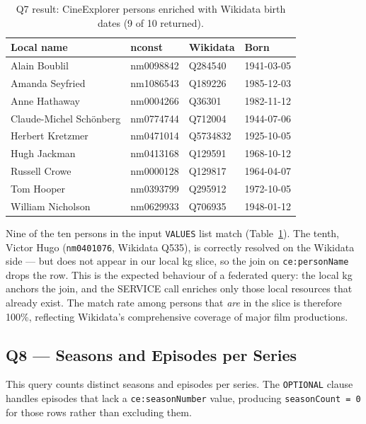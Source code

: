 \begin{table}[H]
\centering
\small
\begin{tabular}{llll}
\hline
\textbf{Local name} & \textbf{nconst} & \textbf{Wikidata} & \textbf{Born} \\
\hline
Alain Boublil           & nm0098842 & Q284540  & 1941-03-05 \\
Amanda Seyfried         & nm1086543 & Q189226  & 1985-12-03 \\
Anne Hathaway           & nm0004266 & Q36301   & 1982-11-12 \\
Claude-Michel Sch\"{o}nberg & nm0774744 & Q712004 & 1944-07-06 \\
Herbert Kretzmer        & nm0471014 & Q5734832 & 1925-10-05 \\
Hugh Jackman            & nm0413168 & Q129591  & 1968-10-12 \\
Russell Crowe           & nm0000128 & Q129817  & 1964-04-07 \\
Tom Hooper              & nm0393799 & Q295912  & 1972-10-05 \\
William Nicholson       & nm0629933 & Q706935  & 1948-01-12 \\
\hline
\end{tabular}
\caption{Q7 result: CineExplorer persons enriched with Wikidata birth dates (9 of 10 returned).}
\label{tab:q7-results}
\end{table}

Nine of the ten persons in the input \texttt{VALUES} list match (Table~\ref{tab:q7-results}). The tenth, Victor Hugo (\texttt{nm0401076}, Wikidata Q535), is correctly resolved on the Wikidata side --- but does not appear in our local \ac{kg} slice, so the join on \texttt{ce:personName} drops the row. This is the expected behaviour of a federated query: the local \ac{kg} anchors the join, and the SERVICE call enriches only those local resources that already exist. The match rate among persons that \emph{are} in the slice is therefore 100\%, reflecting Wikidata's comprehensive coverage of major film productions.

\subsection{Q8 — Seasons and Episodes per Series}

This query counts distinct seasons and episodes per series. The \texttt{OPTIONAL} clause handles episodes that lack a \texttt{ce:seasonNumber} value, producing \texttt{seasonCount~=~0} for those rows rather than excluding them.

